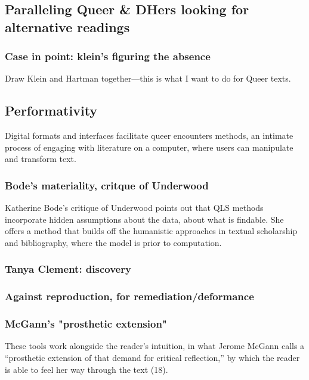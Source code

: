 \documentclass[11pt]{article}
\begin{document}
\subsection{Paralleling Queer \& DHers looking for alternative readings}
\label{sec:org53556d2}
\subsubsection{Case in point: klein's figuring the absence}
\label{sec:orge8a1fb4}
Draw Klein and Hartman together---this is what I want to do for Queer
texts. 


\subsection{Performativity}
\label{sec:org35cd4ce}
Digital formats and interfaces facilitate queer encounters methods, an
intimate process of engaging with literature on a computer, where
users can manipulate and transform text.
\subsubsection{Bode's materiality, critque of Underwood}
\label{sec:org5e16b4b}

Katherine Bode's critique of Underwood points out that QLS methods
incorporate hidden assumptions about the data, about what is
findable. She offers a method that builds off the humanistic
approaches in textual scholarship and bibliography, where the model is
prior to computation. 

\subsubsection{Tanya Clement: discovery}
\label{sec:org18d9e42}

\subsubsection{Against reproduction, for remediation/deformance}
\label{sec:orgd3cbd22}

\subsubsection{McGann's "prosthetic extension"}
\label{sec:orgf534b7b}
These tools work alongside the reader’s intuition, in what Jerome
McGann calls a “prosthetic extension of that demand for critical
reflection,” by which the reader is able to feel her way through the
text (18).
\end{document}
